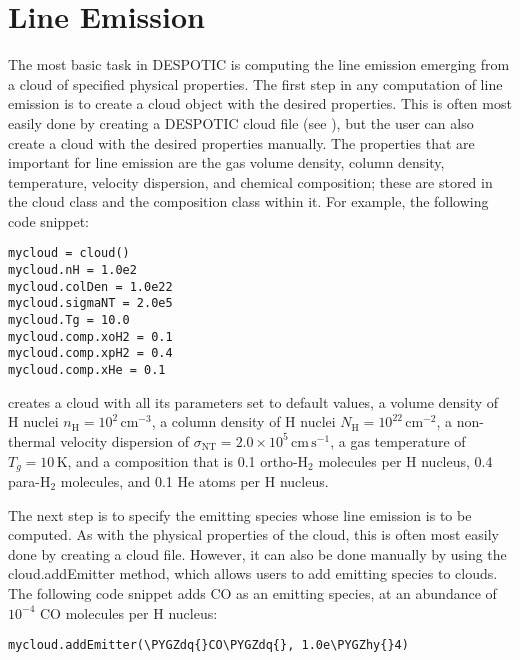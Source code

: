 \documentclass[letterpaper,10pt,english]{sphinxmanual}
\def\PYGZhy{\char`\-}
\def\PYGZdq{\char`\"}
\begin{document}
\section{Line Emission}
\label{functions:ssec-line-emission}\label{functions:line-emission}
The most basic task in DESPOTIC is computing the line emission
emerging from a cloud of specified physical properties. The first step
in any computation of line emission is to create a cloud object with
the desired properties. This is often most easily done by creating a
DESPOTIC cloud file (see {\hyperref[cloudfiles:sec-cloudfiles]{\emph{}}}), but the user can also
create a cloud with the desired properties manually. The properties
that are important for line emission are the gas volume density,
column density, temperature, velocity dispersion, and chemical
composition; these are stored in the cloud class and the composition
class within it. For example, the following code snippet:

\begin{Verbatim}[commandchars=\\\{\}]
mycloud = cloud()
mycloud.nH = 1.0e2
mycloud.colDen = 1.0e22
mycloud.sigmaNT = 2.0e5
mycloud.Tg = 10.0
mycloud.comp.xoH2 = 0.1
mycloud.comp.xpH2 = 0.4
mycloud.comp.xHe = 0.1
\end{Verbatim}

creates a cloud with all its parameters set to default values, a
volume density of H nuclei \(n_{\mathrm{H}} =
10^2\,\mathrm{cm}^{-3}\), a column density of H nuclei
\(N_{\mathrm{H}} = 10^{22}\,\mathrm{cm}^{-2}\), a non-thermal
velocity dispersion of \(\sigma_{\mathrm{NT}} = 2.0 \times
10^5\,\mathrm{cm}\,\mathrm{s}^{-1}\), a gas temperature of \(T_g =
10\,\mathrm{K}\), and a composition that is 0.1
ortho-\(\mathrm{H}_2\) molecules per H nucleus, 0.4
para-\(\mathrm{H}_2\) molecules, and 0.1 He atoms per H nucleus.

The next step is to specify the emitting species whose line emission
is to be computed. As with the physical properties of the cloud, this
is often most easily done by creating a cloud file. However, it can
also be done manually by using the cloud.addEmitter method, which
allows users to add emitting species to clouds. The following code
snippet adds CO as an emitting species, at an abundance of
\(10^{-4}\) CO molecules per H nucleus:

\begin{Verbatim}[commandchars=\\\{\}]
mycloud.addEmitter(\PYGZdq{}CO\PYGZdq{}, 1.0e\PYGZhy{}4)
\end{Verbatim}
\end{document}
